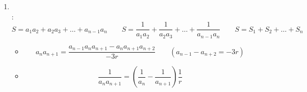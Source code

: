 \begin{enumerate}[label=\arabic*.,leftmargin=*]
\begin{itemize}[label=$\blacktriangleright$]
  \item {}
          {Subtract the equations from each other and divide, so that a fraction in $\Q$ equals a fraction not in $\Q$ -- being of different nature, this is impossible.}
          {Die Gleichungen voneinander subtrahieren und dividieren: ein Bruch aus $\Q$ wäre gleich einem Bruch nicht aus $\Q$ -- unmöglich.}
  \end{itemize}
\item \textit{}\\
  :
  \[S=a_1a_2+a_2a_3+\dots+a_{n-1}a_n\qquad
    S=\frac1{a_1a_2}+\frac1{a_2a_3}+\dots+\frac1{a_{n-1}a_n}\qquad
    S=S_1+S_2+\dots+S_n\]
  \begin{itemize}[label=$\blacktriangleright$]
  \item {}
    \[a_na_{n+1}=\frac{a_{n-1}a_na_{n+1}-a_na_{n+1}a_{n+2}}{-3r}\qquad(a_{n-1}-a_{n+2}=-3r)\]
  \item {}
    \[\frac1{a_na_{n+1}}=\left(\frac1{a_n}-\frac1{a_{n+1}}\right)\frac1r\]
  \end{itemize}
\end{enumerate}

